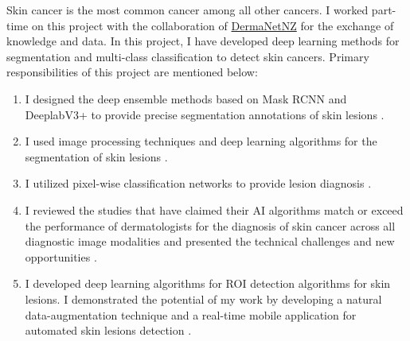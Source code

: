 \documentclass[10pt,a4paper]{article} %
\begin{document}
	
	\spacedhrule{-0.4em}{-0.6em} %
	
	
	
	
	
	
	
	
	
	
	
	\inlineheadsection 
	{Skin cancer is the most common cancer among all other cancers.} {I worked part-time on this project with the collaboration of \href{https://www.dermnetnz.org/} {DermaNetNZ} for the exchange of knowledge and data. In this project, I have developed deep learning methods for segmentation and multi-class classification to detect skin cancers. Primary responsibilities of this project are mentioned below:} 
	
	\begin{enumerate}
		\item I designed the deep ensemble methods based on Mask RCNN and DeeplabV3+ to provide precise segmentation annotations of skin lesions \cite{goyal2019skin}.
		\item I used image processing techniques and deep learning algorithms for the segmentation of skin lesions \cite{goyal2019skin, hua2019effect}.  
		\item I utilized pixel-wise classification networks to provide lesion diagnosis \cite{goyal2017multi}.
		\item I reviewed the studies that have claimed their AI algorithms match or exceed the performance of dermatologists for the diagnosis of skin cancer across all diagnostic image modalities and presented the technical challenges and new opportunities \cite{goyalartificial, goyal2019artificial}.
		\item I developed deep learning algorithms for ROI detection algorithms for skin lesions. I demonstrated the potential of my work by developing a natural data-augmentation technique and a real-time mobile application for automated skin lesions detection \cite{goyal2018region}.
		
	\end{enumerate}    
	
	
	\spacedhrule{-0.4em}{-0.6em}%
	
\end{document}
